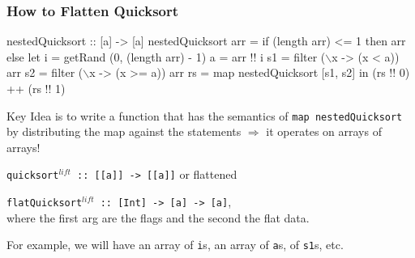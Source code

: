 \documentclass{beamer}
\newcommand{\emp}[1]{\textcolor{DikuRed}{ #1}}
\newcommand{\mymath}[1]{$ #1 $}
\begin{document}
\begin{frame}[fragile,t]
  \frametitle{How to Flatten Quicksort}

\begin{colorcode}[fontsize=\scriptsize]
nestedQuicksort :: [a] -> [a]
nestedQuicksort arr = 
  if (length arr) <= 1 then arr else 
  let i = getRand (0, (length arr) - 1)
      a = arr !! i
      s1 = filter (\mymath{\backslash}x -> (x <  a)) arr
      s2 = filter (\mymath{\backslash}x -> (x >= a)) arr
      rs = map nestedQuicksort [s1, s2]
  in  (rs !! 0) ++ (rs !! 1)
\end{colorcode}

\alert{Key Idea} is to write a function that
has the semantics of {\tt map nestedQuicksort}
by distributing the map against the statements 
$\Rightarrow$ it operates on arrays of arrays!
\medskip

{\tt quicksort$^{lift}$ :: [[a]] -> [[a]]} or flattened\\
\medskip

{\tt flatQuicksort$^{lift}$ :: [Int] -> [a] -> [a]},\\
where the first arg are the flags and the second the flat data.
\medskip

\emp{For example, we will have an array of {\tt i}s, an array of {\tt a}s,
of {\tt s1}s, etc.}
\end{frame}
\end{document}
